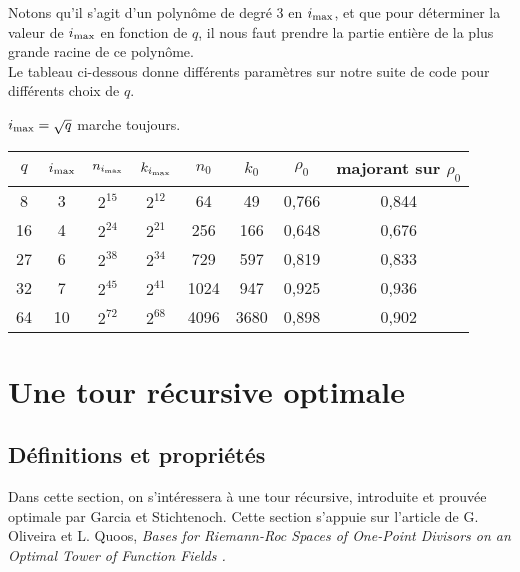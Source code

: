 \documentclass[10pt]{article}
\newcommand{\s}{\vspace{0.3cm}}
\newcommand{\ii}{i_{\rm{max}}}
\newcommand{\jade}[1]{{\color{blue!50!red}#1}}
\begin{document}
Notons qu'il s'agit d'un polynôme de degré 3 en $\ii$, et que pour déterminer la valeur de $\ii$ en fonction de $q$, il nous faut prendre la partie entière de la plus grande racine de ce polynôme. \\
Le tableau ci-dessous donne différents paramètres sur notre suite de code pour différents choix de $q$.


\jade{$\ii = \sqrt{q}$ marche toujours.}
\newpage

\begin{center}
\begin{tabular}{|c|c|c|c|c|c|c|c|}
\hline
$q$ & $\ii$ & $n_{\ii}$ & $k_{\ii}$ & $n_0$ & $k_0$ & $\rho_0$ & majorant sur $\rho_0$ \\ 
\hline
8 & 3 & $2^{15}$ & $2^{12}$ & 64 & 49 & 0,766 & 0,844 \\
\hline
16 & 4 & $2^{24}$ & $2^{21}$ & 256 & 166 & 0,648 & 0,676 \\
\hline
27 & 6 & $2^{38}$ & $2^{34}$ & 729 & 597 & 0,819 & 0,833 \\
\hline
32 & 7 & $2^{45}$ & $2^{41}$ & 1024 & 947 & 0,925 & 0,936 \\
\hline
64 & 10 & $2^{72}$ & $2^{68}$ & 4096 & 3680 & 0,898 & 0,902 \\
\hline
\end{tabular}
\end{center}

\s

\section{Une tour récursive optimale}

\s

\subsection{Définitions et propriétés}

\s

Dans cette section, on s’intéressera à une tour récursive, introduite et prouvée optimale par Garcia et Stichtenoch. Cette section s'appuie sur l'article de G. Oliveira et L. Quoos, \it{Bases for Riemann-Roc Spaces of One-Point Divisors on an Optimal Tower of Function Fields} \rm.
\end{document}
